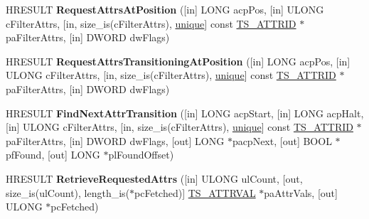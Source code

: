 \begin{DoxyCompactItemize}
\item 
\mbox{\label{interface_i_text_store_a_c_p_ae96197952d2cfca876e6364e5bddf8b7}} 
H\+R\+E\+S\+U\+LT {\bfseries Request\+Attrs\+At\+Position} (\mbox{[}in\mbox{]} L\+O\+NG acp\+Pos, \mbox{[}in\mbox{]} U\+L\+O\+NG c\+Filter\+Attrs, \mbox{[}in, size\+\_\+is(c\+Filter\+Attrs), \hyperlink{interfaceunique}{unique}\mbox{]} const \hyperlink{interface_g_u_i_d}{T\+S\+\_\+\+A\+T\+T\+R\+ID} $\ast$pa\+Filter\+Attrs, \mbox{[}in\mbox{]} D\+W\+O\+RD dw\+Flags)
\item 
\mbox{\label{interface_i_text_store_a_c_p_a3705a8691949339dd3052ed4483946be}} 
H\+R\+E\+S\+U\+LT {\bfseries Request\+Attrs\+Transitioning\+At\+Position} (\mbox{[}in\mbox{]} L\+O\+NG acp\+Pos, \mbox{[}in\mbox{]} U\+L\+O\+NG c\+Filter\+Attrs, \mbox{[}in, size\+\_\+is(c\+Filter\+Attrs), \hyperlink{interfaceunique}{unique}\mbox{]} const \hyperlink{interface_g_u_i_d}{T\+S\+\_\+\+A\+T\+T\+R\+ID} $\ast$pa\+Filter\+Attrs, \mbox{[}in\mbox{]} D\+W\+O\+RD dw\+Flags)
\item 
\mbox{\label{interface_i_text_store_a_c_p_ada89881ebd96c65cb63729f0c1cb2949}} 
H\+R\+E\+S\+U\+LT {\bfseries Find\+Next\+Attr\+Transition} (\mbox{[}in\mbox{]} L\+O\+NG acp\+Start, \mbox{[}in\mbox{]} L\+O\+NG acp\+Halt, \mbox{[}in\mbox{]} U\+L\+O\+NG c\+Filter\+Attrs, \mbox{[}in, size\+\_\+is(c\+Filter\+Attrs), \hyperlink{interfaceunique}{unique}\mbox{]} const \hyperlink{interface_g_u_i_d}{T\+S\+\_\+\+A\+T\+T\+R\+ID} $\ast$pa\+Filter\+Attrs, \mbox{[}in\mbox{]} D\+W\+O\+RD dw\+Flags, \mbox{[}out\mbox{]} L\+O\+NG $\ast$pacp\+Next, \mbox{[}out\mbox{]} B\+O\+OL $\ast$pf\+Found, \mbox{[}out\mbox{]} L\+O\+NG $\ast$pl\+Found\+Offset)
\item 
\mbox{\label{interface_i_text_store_a_c_p_a8061b820d549b2387369a94c81269cc2}} 
H\+R\+E\+S\+U\+LT {\bfseries Retrieve\+Requested\+Attrs} (\mbox{[}in\mbox{]} U\+L\+O\+NG ul\+Count, \mbox{[}out, size\+\_\+is(ul\+Count), length\+\_\+is($\ast$pc\+Fetched)\mbox{]} \hyperlink{struct_t_s___a_t_t_r_v_a_l}{T\+S\+\_\+\+A\+T\+T\+R\+V\+AL} $\ast$pa\+Attr\+Vals, \mbox{[}out\mbox{]} U\+L\+O\+NG $\ast$pc\+Fetched)
\item 
\mbox{\label{interface_i_text_store_a_c_p_ad24cfa80a9be4916b0f278d83a94d82c}} 

\end{DoxyCompactItemize}
